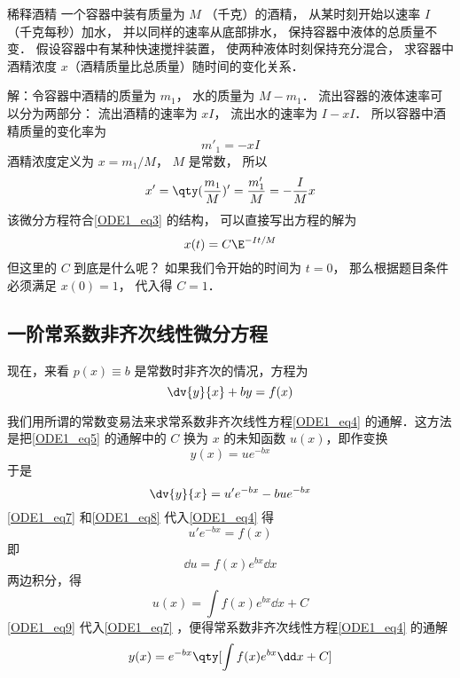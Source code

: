 \begin{example}{稀释酒精}
一个容器中装有质量为 $M$ （千克）的酒精， 从某时刻开始以速率 $I$ （千克每秒）加水， 并以同样的速率从底部排水， 保持容器中液体的总质量不变． 假设容器中有某种快速搅拌装置， 使两种液体时刻保持充分混合， 求容器中酒精浓度 $x$（酒精质量比总质量）随时间的变化关系．

解：令容器中酒精的质量为 $m_1$， 水的质量为 $M - m_1$． 流出容器的液体速率可以分为两部分： 流出酒精的速率为 $xI$， 流出水的速率为 $I - xI$． 所以容器中酒精质量的变化率为
\begin{equation}
m'_1 = -xI
\end{equation}
酒精浓度定义为 $x = m_1/M$， $M$ 是常数， 所以
\begin{equation}
x' = \qty(\frac{m_1}{M})' = \frac{m'_1}{M} = -\frac{I}{M}x
\end{equation}
该微分方程符合\autoref{ODE1_eq3} 的结构， 可以直接写出方程的解为
\begin{equation}
x(t) = C\E^{-It/M}
\end{equation}
但这里的 $C$ 到底是什么呢？ 如果我们令开始的时间为 $t = 0$， 那么根据题目条件必须满足 $x(0) = 1$， 代入得 $C = 1$．
\end{example}

\subsection{一阶常系数非齐次线性微分方程}
现在，来看 $p(x) \equiv b$ 是常数时非齐次的情况，方程为
\begin{equation}\label{ODE1_eq4}
\dv{y}{x} + by = f(x)
\end{equation}

我们用所谓的常数变易法来求常系数非齐次线性方程\autoref{ODE1_eq4} 的通解．这方法是把\autoref{ODE1_eq5} 的通解中的 $C$ 换为 $x$ 的未知函数 $u(x)$，即作变换
\begin{equation}\label{ODE1_eq7}
y(x)=ue^{-bx}
\end{equation}
于是
\begin{equation}\label{ODE1_eq8}
\dv{y}{x}=u'e^{-bx}-bue^{-bx}
\end{equation}
\autoref{ODE1_eq7} 和\autoref{ODE1_eq8} 代入\autoref{ODE1_eq4} 得
\begin{equation}
u'e^{-bx}=f(x)
\end{equation}
即
\begin{equation}
\dd u=f(x)e^{bx}\dd x
\end{equation}
两边积分，得
\begin{equation}\label{ODE1_eq9}
u(x)=\int f(x)e^{bx}\dd x+C
\end{equation}
\autoref{ODE1_eq9} 代入\autoref{ODE1_eq7} ，便得常系数非齐次线性方程\autoref{ODE1_eq4} 的通解
\begin{equation}
y(x)=e^{-bx}\qty[\int f(x)e^{bx}\dd x+C]
\end{equation}

